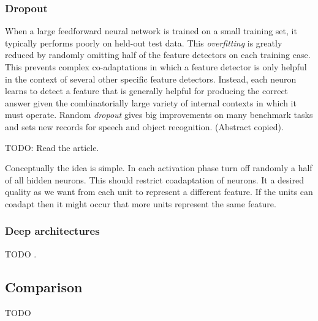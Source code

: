 \subsubsection{Dropout}
When a large feedforward neural network is trained on a small training set,
it typically performs poorly on held-out test data. This \emph{overfitting} is greatly
reduced by randomly omitting half of the feature detectors on each training
case. This prevents complex co-adaptations in which a feature detector is only
helpful in the context of several other specific feature detectors. Instead, each
neuron learns to detect a feature that is generally helpful for producing the
correct answer given the combinatorially large variety of internal contexts in
which it must operate. Random \emph{dropout} gives big improvements on many
benchmark tasks and sets new records for speech and object recognition.
 \cite{hinton2012improving} (Abstract copied). 
 
 TODO: Read the article. 
 
Conceptually the idea is simple. In each activation phase turn off randomly a half of all hidden neurons. This should restrict coadaptation of neurons. It a desired quality as we want from each unit to represent a different feature. If the units can coadapt then it might occur that more units represent the same feature. 

\subsubsection{Deep architectures} 
TODO  \cite{bengio2009learning}.

\subsection{Comparison}
TODO
